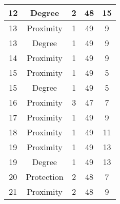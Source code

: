 \documentclass[results.tex]{subfiles}
\begin{document}
\begin{center}
\begin{tabular}{| c || c | c | c | c |}
            \hline
            12                      & Degree                       & 2                      & 48                      & 15                   \\
            \hline
            13                      & Proximity                    & 1                      & 49                      & 9                    \\
            \hline
            13                      & Degree                       & 1                      & 49                      & 9                    \\
            \hline
            14                      & Proximity                    & 1                      & 49                      & 9                    \\
            \hline
            15                      & Proximity                    & 1                      & 49                      & 5                    \\
            \hline
            15                      & Degree                       & 1                      & 49                      & 5                    \\
            \hline
            16                      & Proximity                    & 3                      & 47                      & 7                    \\
            \hline
            17                      & Proximity                    & 1                      & 49                      & 9                    \\
            \hline
            18                      & Proximity                    & 1                      & 49                      & 11                   \\
            \hline
            19                      & Proximity                    & 1                      & 49                      & 13                   \\
            \hline
            19                      & Degree                       & 1                      & 49                      & 13                   \\
            \hline
            20                      & Protection                   & 2                      & 48                      & 7                    \\
            \hline
            21                      & Proximity                    & 2                      & 48                      & 9                    \\

\end{tabular}
\end{center}
\end{document}
